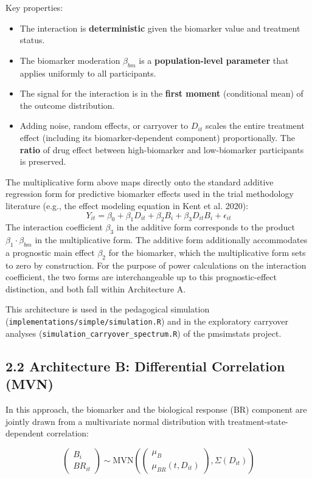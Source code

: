 \documentclass[11pt]{article}
\begin{document}
Key properties:

\begin{itemize}
\item The interaction is \textbf{deterministic} given the biomarker value
  and treatment status.
\item The biomarker moderation $\beta_{bm}$ is a \textbf{population-level
  parameter} that applies uniformly to all participants.
\item The signal for the interaction is in the \textbf{first moment}
  (conditional mean) of the outcome distribution.
\item Adding noise, random effects, or carryover to $D_{it}$ scales
  the entire treatment effect (including its biomarker-dependent
  component) proportionally. The \textbf{ratio} of drug effect between
  high-biomarker and low-biomarker participants is preserved.
\end{itemize}

The multiplicative form above maps directly onto the standard
additive regression form for predictive biomarker effects used
in the trial methodology literature (e.g., the effect modeling
equation in Kent et al. 2020):
\[Y_{it} = \beta_0 + \beta_1 D_{it} + \beta_2 B_i + \beta_3
D_{it} B_i + \epsilon_{it}\]
The interaction coefficient $\beta_3$ in the additive form
corresponds to the product $\beta_1 \cdot \beta_{bm}$ in the
multiplicative form. The additive form additionally accommodates
a prognostic main effect $\beta_2$ for the biomarker, which the
multiplicative form sets to zero by construction. For the
purpose of power calculations on the interaction coefficient,
the two forms are interchangeable up to this prognostic-effect
distinction, and both fall within Architecture A.

This architecture is used in the pedagogical simulation
(\texttt{implementations/simple/simulation.R}) and in the exploratory carryover
analyses (\texttt{simulation\_carryover\_spectrum.R}) of the
pmsimstats project.

\subsection{2.2 Architecture B: Differential Correlation (MVN)}

In this approach, the biomarker and the biological response (BR)
component are jointly drawn from a multivariate normal distribution
with treatment-state-dependent correlation:

\[\begin{pmatrix} B_i \\ BR_{it} \end{pmatrix} \sim
\text{MVN}\left(\begin{pmatrix} \mu_B \\ \mu_{BR}(t, D_{it})
\end{pmatrix}, \Sigma(D_{it})\right)\]
\end{document}
